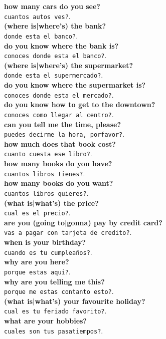 \documentclass[twocolumn]{article}
\begin{document}
  \textbf{how many cars do you see?}\\\texttt{cuantos autos ves?}.\\
  \textbf{(where is|where's) the bank?}\\\texttt{donde esta el banco?}.\\
  \textbf{do you know where the bank is?}\\\texttt{conoces donde esta el banco?}.\\
  \textbf{(where is|where's) the supermarket?}\\\texttt{donde esta el supermercado?}.\\
  \textbf{do you know where the supermarket is?}\\\texttt{conoces donde esta el mercado?}.\\
  \textbf{do you know how to get to the downtown?}\\\texttt{conoces como llegar al centro?}.\\
  \textbf{can you tell me the time, please?}\\\texttt{puedes decirme la hora, porfavor?}.\\
  \textbf{how much does that book cost?}\\\texttt{cuanto cuesta ese libro?}.\\
  \textbf{how many books do you have?}\\\texttt{cuantos libros tienes?}.\\
  \textbf{how many books do you want?}\\\texttt{cuantos libros quieres?}.\\
  \textbf{(what is|what's) the price?}\\\texttt{cual es el precio?}.\\
  \textbf{are you (going to|gonna) pay by credit card?}\\\texttt{vas a pagar con tarjeta de credito?}.\\
  \textbf{when is your birthday?}\\\texttt{cuando es tu cumplea\~nos?}.\\
  \textbf{why are you here?}\\\texttt{porque estas aqui?}.\\
  \textbf{why are you telling me this?}\\\texttt{porque me estas contanto esto?}.\\
  \textbf{(what is|what's) your favourite holiday?}\\\texttt{cual es tu feriado favorito?}.\\
  \textbf{what are your hobbies?}\\\texttt{cuales son tus pasatiempos?}.\\
\end{document}
